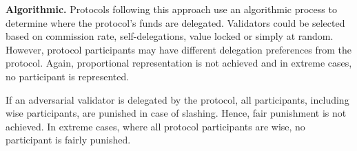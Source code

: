 

\noindent
\textbf{Algorithmic.}
Protocols following this approach use an algorithmic process to determine
where the protocol's funds are delegated. Validators could be selected based on
commission rate, self-delegations, value locked or simply at random.
However, protocol participants may have different delegation preferences from
the protocol. Again, proportional representation is not achieved and in
extreme cases, no participant is represented.

If an adversarial validator is delegated by the protocol, all participants,
including wise participants, are punished in case of slashing. Hence,
fair punishment is not achieved. In extreme cases, where all protocol
participants are wise, no participant is fairly punished.









